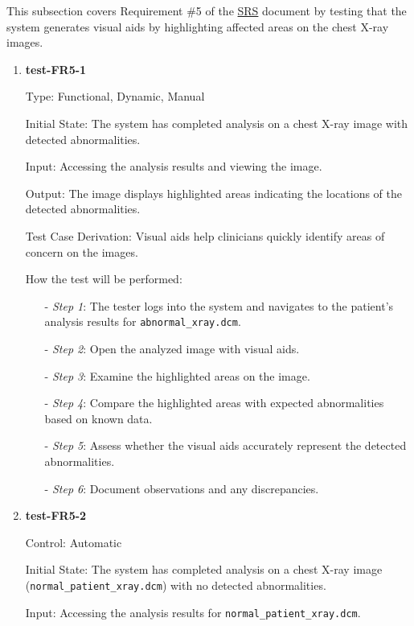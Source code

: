 \documentclass[12pt, titlepage]{article}
\begin{document}
This subsection covers Requirement \#5 of the \href{https://github.com/RezaJodeiri/CXR-Capstone/blob/main/docs/SRS/SRS.pdf}{SRS} \citep{SRS}
document by testing that the system generates visual aids by highlighting affected areas on the chest X-ray images.

\begin{enumerate}

\item \textbf{test-FR5-1} \label{test-FR5-1}

Type: Functional, Dynamic, Manual

Initial State: The system has completed analysis on a chest X-ray image with detected abnormalities.

Input: Accessing the analysis results and viewing the image.

Output: The image displays highlighted areas indicating the locations of the detected abnormalities.

Test Case Derivation: Visual aids help clinicians quickly identify areas of concern on the images.

How the test will be performed:
\begin{itemize}
  \item[-] \textit{Step 1}: The tester logs into the system and navigates to the patient's analysis results for \texttt{abnormal\_xray.dcm}.
  \item[-] \textit{Step 2}: Open the analyzed image with visual aids.
  \item[-] \textit{Step 3}: Examine the highlighted areas on the image.
  \item[-] \textit{Step 4}: Compare the highlighted areas with expected abnormalities based on known data.
  \item[-] \textit{Step 5}: Assess whether the visual aids accurately represent the detected abnormalities.
  \item[-] \textit{Step 6}: Document observations and any discrepancies.
\end{itemize}

\item \textbf{test-FR5-2} \label{test-FR5-2}

Control: Automatic

Initial State: The system has completed analysis on a chest X-ray image (\texttt{normal\_patient\_xray.dcm}) with no detected abnormalities.

Input: Accessing the analysis results for \texttt{normal\_patient\_xray.dcm}.


\end{enumerate}
\end{document}
